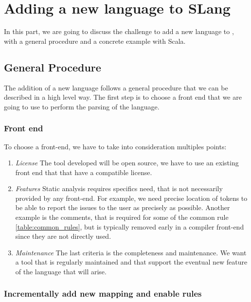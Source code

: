 \section{Adding a new language to SLang}
\label{sec:new_language}

In this part, we are going to discuss the challenge to add a new language to \slang{}, with a general procedure and a concrete example with Scala.

\subsection{General Procedure}
\label{subsec:general_procedure}

The addition of a new language follows a general procedure that we can be described in a high level way.
The first step is to choose a front end that we are going to use to perform the parsing of the language. 

\subsubsection{Front end}
\label{subsubsec:front_end}

To choose a front-end, we have to take into consideration multiples points:
\begin{enumerate}
	\item \textit{License} \newline The tool developed will be open source, we have to use an existing front end that that have a compatible license.
	\item \textit{Features} \newline Static analysis requires specifics need, that is not necessarily provided by any front-end. 	For example, we need precise location of tokens to be able to report the issues to the user as precisely as possible. Another example is the comments, that is required for some of the common rule \ref{table:common_rules}, but is typically removed early in a compiler front-end since they are not directly used.
	\item \textit{Maintenance} \newline 
	The last criteria is the completeness and maintenance. We want a tool that is regularly maintained and that support the eventual new feature of the language that will arise. 
\end{enumerate}

\subsubsection{Incrementally add new mapping and enable rules}
\label{subsubsec:new_mapping_and_enables_rules}

